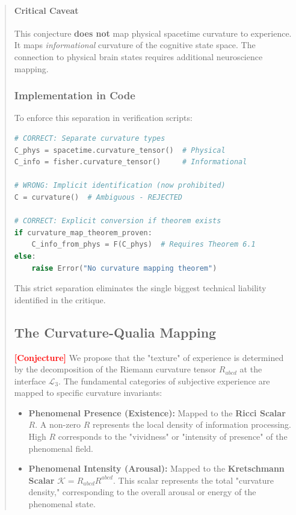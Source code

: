 \documentclass[11pt,titlepage]{article}
\newcommand{\interface}{\mathcal{L}_3}
\newcommand{\tagconj}{\textcolor{red}{\textbf{[Conjecture]}} }
\begin{document}
\begin{abstract}
\paragraph{Critical Caveat}
This conjecture \textbf{does not} map physical spacetime curvature to experience. It maps \emph{informational} curvature of the cognitive state space. The connection to physical brain states requires additional neuroscience mapping.

\subsubsection{Implementation in Code}
To enforce this separation in verification scripts:

\begin{lstlisting}[language=Python]
# CORRECT: Separate curvature types
C_phys = spacetime.curvature_tensor()  # Physical
C_info = fisher.curvature_tensor()     # Informational

# WRONG: Implicit identification (now prohibited)
C = curvature()  # Ambiguous - REJECTED

# CORRECT: Explicit conversion if theorem exists
if curvature_map_theorem_proven:
    C_info_from_phys = F(C_phys)  # Requires Theorem 6.1
else:
    raise Error("No curvature mapping theorem")
\end{lstlisting}

This strict separation eliminates the single biggest technical liability identified in the critique.


\subsection{The Curvature-Qualia Mapping}
\tagconj We propose that the "texture" of experience is determined by the decomposition of the Riemann curvature tensor $R_{abcd}$ at the interface $\interface$. The fundamental categories of subjective experience are mapped to specific curvature invariants:

\begin{itemize}
    
\item \textbf{Phenomenal Presence (Existence):} Mapped to the \textbf{Ricci Scalar} $R$. A non-zero $R$ represents the local density of information processing. High $R$ corresponds to the "vividness" or "intensity of presence" of the phenomenal field.
    
    
\item \textbf{Phenomenal Intensity (Arousal):} Mapped to the \textbf{Kretschmann Scalar} $\mathcal{K} = R_{abcd}R^{abcd}$. This scalar represents the total "curvature density," corresponding to the overall arousal or energy of the phenomenal state.
    

\end{itemize}
\end{abstract}
\end{document}
